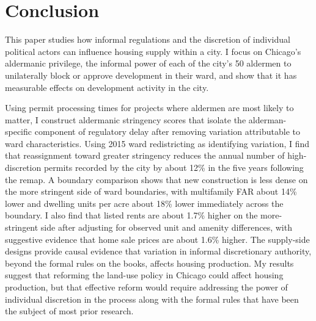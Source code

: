 
\section{Conclusion}
\label{sec:conclusion}

This paper studies how informal regulations and the discretion of individual political actors can influence housing supply within a city.
I focus on Chicago's aldermanic privilege, the informal power of each of the city's 50 aldermen to unilaterally block or approve development in their ward, and show that it has measurable effects on development activity in the city.

Using permit processing times for projects where aldermen are most likely to matter, I construct aldermanic stringency scores that isolate the alderman-specific component of regulatory delay after removing variation attributable to ward characteristics.
Using 2015 ward redistricting as identifying variation, I find that reassignment toward greater stringency reduces the annual number of high-discretion permits recorded by the city by about 12\% in the five years following the remap.
A boundary comparison shows that new construction is less dense on the more stringent side of ward boundaries, with multifamily FAR about 14\% lower and dwelling units per acre about 18\% lower immediately across the boundary.
I also find that listed rents are about 1.7\% higher on the more-stringent side after adjusting for observed unit and amenity differences, with suggestive evidence that home sale prices are about 1.6\% higher.
The supply-side designs provide causal evidence that variation in informal discretionary authority, beyond the formal rules on the books, affects housing production.
My results suggest that reforming the land-use policy in Chicago could affect housing production, but that effective reform would require addressing the power of individual discretion in the process along with the formal rules that have been the subject of most prior research.

